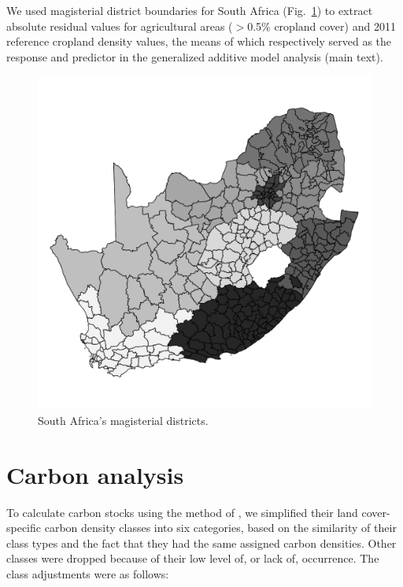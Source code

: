 \documentclass[12pt, titlepage]{article}
\begin{document}
We used magisterial district boundaries for South Africa (Fig.~\ref{fig:mdists}) to extract absolute residual values for agricultural areas ($>$0.5\% cropland cover) and 2011 reference cropland density values, the means of which respectively served as the response and predictor in the generalized additive model \citep{wood_mgcv:_2001} analysis (main text). 


\begin{figure}[!ht]
  \centering
     \includegraphics[scale = 0.7]{figures/md_map.pdf} 
      \caption{South Africa's magisterial districts.}
      \label{fig:mdists}
\end{figure}

\clearpage
\section{\large Carbon analysis}

To calculate carbon stocks using the method of \citet{ruesch_new_2008}, we simplified their land cover-specific carbon density classes into six categories, based on the similarity of their class types and the fact that they had the same assigned carbon densities. Other classes were dropped because of their low level of, or lack of, occurrence. The class adjustments were as follows:
\end{document}
